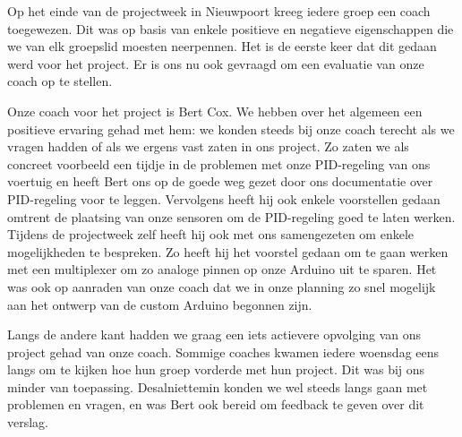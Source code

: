 Op het einde van de projectweek in Nieuwpoort kreeg iedere groep een coach toegewezen. Dit was op basis van enkele positieve en negatieve eigenschappen die we van elk groepslid moesten neerpennen. Het is de eerste keer dat dit gedaan werd voor het project. Er is ons nu ook gevraagd om een evaluatie van onze coach op te stellen.

Onze coach voor het project is Bert Cox. We hebben over het algemeen een positieve ervaring gehad met hem: we konden steeds bij onze coach terecht als we vragen hadden of als we ergens vast zaten in ons project. Zo zaten we als concreet voorbeeld een tijdje in de problemen met onze PID-regeling van ons voertuig en heeft Bert ons op de goede weg gezet door ons documentatie over PID-regeling voor te leggen. Vervolgens heeft hij ook enkele voorstellen gedaan omtrent de plaatsing van onze sensoren om de PID-regeling goed te laten werken. Tijdens de projectweek zelf heeft hij ook met ons samengezeten om enkele mogelijkheden te bespreken. Zo heeft hij het voorstel gedaan om te gaan werken met een multiplexer om zo analoge pinnen op onze Arduino uit te sparen. Het was ook op aanraden van onze coach dat we in onze planning zo snel mogelijk aan het ontwerp van de custom Arduino begonnen zijn. 

Langs de andere kant hadden we graag een iets actievere opvolging van ons project gehad van onze coach. Sommige coaches kwamen iedere woensdag eens langs om te kijken hoe hun groep vorderde met hun project. Dit was bij ons minder van toepassing. Desalniettemin konden we wel steeds langs gaan met problemen en vragen, en was Bert ook bereid om feedback te geven over dit verslag.
